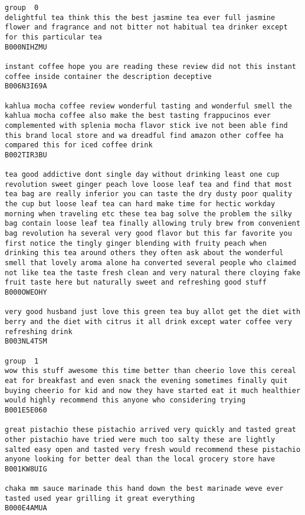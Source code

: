 \documentclass[11pt]{article}
\begin{document}
    \begin{Verbatim}[commandchars=\\\{\}]
group  0
delightful tea think this the best jasmine tea ever full jasmine flower and fragrance and not bitter not habitual tea drinker except for this particular tea
B000NIHZMU

instant coffee hope you are reading these review did not this instant coffee inside container the description deceptive
B006N3I69A

kahlua mocha coffee review wonderful tasting and wonderful smell the kahlua mocha coffee also make the best tasting frappucinos ever complemented with splenia mocha flavor stick ive not been able find this brand local store and wa dreadful find amazon other coffee ha compared this for iced coffee drink
B002TIR3BU

tea good addictive dont single day without drinking least one cup revolution sweet ginger peach love loose leaf tea and find that most tea bag are really inferior you can taste the dry dusty poor quality the cup but loose leaf tea can hard make time for hectic workday morning when traveling etc these tea bag solve the problem the silky bag contain loose leaf tea finally allowing truly brew from convenient bag revolution ha several very good flavor but this far favorite you first notice the tingly ginger blending with fruity peach when drinking this tea around others they often ask about the wonderful smell that lovely aroma alone ha converted several people who claimed not like tea the taste fresh clean and very natural there cloying fake fruit taste here but naturally sweet and refreshing good stuff
B000OWEOHY

very good husband just love this green tea buy allot get the diet with berry and the diet with citrus it all drink except water coffee very refreshing drink
B003NL4TSM

group  1
wow this stuff awesome this time better than cheerio love this cereal eat for breakfast and even snack the evening sometimes finally quit buying cheerio for kid and now they have started eat it much healthier would highly recommend this anyone who considering trying
B001E5E060

great pistachio these pistachio arrived very quickly and tasted great other pistachio have tried were much too salty these are lightly salted easy open and tasted very fresh would recommend these pistachio anyone looking for better deal than the local grocery store have
B001KW8UIG

chaka mm sauce marinade this hand down the best marinade weve ever tasted used year grilling it great everything
B000E4AMUA


\end{Verbatim}
\end{document}
